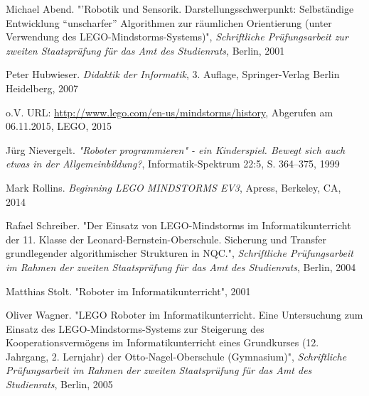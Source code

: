 \begin{thebibliography}{ABCD}

\renewcommand{\refname}{\normalsize Literaturverzeichnis}

Michael Abend. "'Robotik und Sensorik. Darstellungsschwerpunkt: Selbständige Entwicklung "`unscharfer"' Algorithmen zur räumlichen Orientierung (unter Verwendung des LEGO-Mindstorms-Systems)", \emph{Schriftliche Prüfungsarbeit zur zweiten Staatsprüfung für das Amt des Studienrats}, Berlin, 2001

Peter Hubwieser. \emph{Didaktik der Informatik}, 3. Auflage, Springer-Verlag Berlin Heidelberg, 2007

o.V. URL: \url{http://www.lego.com/en-us/mindstorms/history}, Abgerufen am 06.11.2015, LEGO, 2015

Jürg Nievergelt. \emph{"Roboter programmieren" - ein Kinderspiel. Bewegt sich auch etwas in der Allgemeinbildung?}, Informatik-Spektrum 22:5, S. 364--375, 1999

Mark Rollins. \emph{Beginning LEGO MINDSTORMS EV3}, Apress, Berkeley, CA, 2014

Rafael Schreiber. "Der Einsatz von LEGO-Mindstorms im Informatikunterricht der 11. Klasse der Leonard-Bernstein-Oberschule. Sicherung und Transfer grundlegender algorithmischer Strukturen in NQC.", \emph{Schriftliche Prüfungsarbeit im Rahmen der zweiten Staatsprüfung für das Amt des Studienrats}, Berlin, 2004

Matthias Stolt. "Roboter im Informatikunterricht", 2001

Oliver Wagner. "LEGO Roboter im Informatikunterricht. Eine Untersuchung zum Einsatz des LEGO-Mindstorms-Systems zur Steigerung des Kooperationsvermögens im Informatikunterricht eines Grundkurses (12. Jahrgang, 2. Lernjahr) der Otto-Nagel-Oberschule (Gymnasium)", \emph{Schriftliche Prüfungsarbeit im Rahmen der zweiten Staatsprüfung für das Amt des Studienrats}, Berlin, 2005

\end{thebibliography}